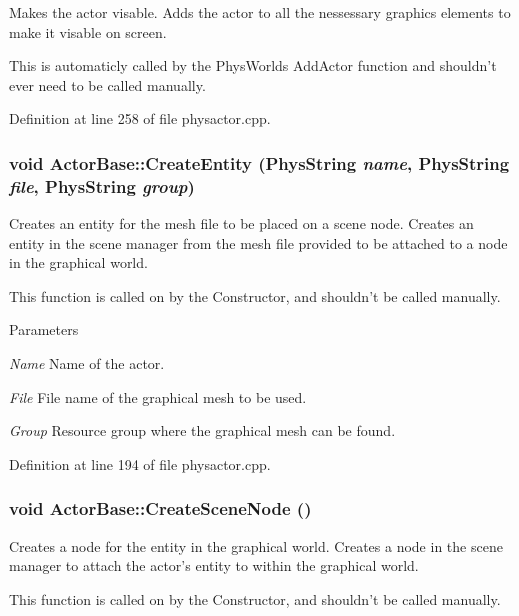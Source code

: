 Makes the actor visable. Adds the actor to all the nessessary graphics elements to make it visable on screen. \par
 This is automaticly called by the PhysWorlds AddActor function and shouldn't ever need to be called manually. 

Definition at line 258 of file physactor.cpp.\hypertarget{classActorBase_aa87583c47b8653e8ac7d96f1481b57fd}{
\subsubsection[{CreateEntity}]{\setlength{\rightskip}{0pt plus 5cm}void ActorBase::CreateEntity (PhysString {\em name}, \/  PhysString {\em file}, \/  PhysString {\em group})}}
\label{dd/d7b/classActorBase_aa87583c47b8653e8ac7d96f1481b57fd}


Creates an entity for the mesh file to be placed on a scene node. Creates an entity in the scene manager from the mesh file provided to be attached to a node in the graphical world. \par
 This function is called on by the Constructor, and shouldn't be called manually. 
\begin{DoxyParams}{Parameters}
\item[{\em Name}]Name of the actor. \item[{\em File}]File name of the graphical mesh to be used. \item[{\em Group}]Resource group where the graphical mesh can be found. \end{DoxyParams}


Definition at line 194 of file physactor.cpp.\hypertarget{classActorBase_a168cd57e20b2adfc5cae21627ddbae31}{
\subsubsection[{CreateSceneNode}]{\setlength{\rightskip}{0pt plus 5cm}void ActorBase::CreateSceneNode ()}}
\label{dd/d7b/classActorBase_a168cd57e20b2adfc5cae21627ddbae31}


Creates a node for the entity in the graphical world. Creates a node in the scene manager to attach the actor's entity to within the graphical world. \par
 This function is called on by the Constructor, and shouldn't be called manually. 

